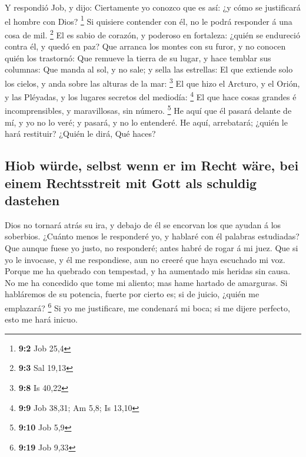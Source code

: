  Y respondió Job, y dijo:  Ciertamente yo
conozco que es así: ¿y cómo se justificará el hombre con Dios?
\footnote{\textbf{9:2} Job 25,4}  Si quisiere contender
con él, no le podrá responder á una cosa de mil. \footnote{\textbf{9:3}
  Sal 19,13}  El es sabio de corazón, y poderoso en
fortaleza: ¿quién se endureció contra él, y quedó en paz? 
Que arranca los montes con su furor, y no conocen quién los trastornó:
 Que remueve la tierra de su lugar, y hace temblar sus
columnas:  Que manda al sol, y no sale; y sella las
estrellas:  El que extiende solo los cielos, y anda sobre
las alturas de la mar: \footnote{\textbf{9:8} Is 40,22} 
El que hizo el Arcturo, y el Orión, y las Pléyadas, y los lugares
secretos del mediodía: \footnote{\textbf{9:9} Job 38,31; Am 5,8; Is
  13,10}  El que hace cosas grandes é incomprensibles, y
maravillosas, sin número. \footnote{\textbf{9:10} Job 5,9}
 He aquí que él pasará delante de mí, y yo no lo veré; y
pasará, y no lo entenderé.  He aquí, arrebatará; ¿quién
le hará restituir? ¿Quién le dirá, Qué haces?

\hypertarget{hiob-wuxfcrde-selbst-wenn-er-im-recht-wuxe4re-bei-einem-rechtsstreit-mit-gott-als-schuldig-dastehen}{%
\subsection{Hiob würde, selbst wenn er im Recht wäre, bei einem
Rechtsstreit mit Gott als schuldig
dastehen}\label{hiob-wuxfcrde-selbst-wenn-er-im-recht-wuxe4re-bei-einem-rechtsstreit-mit-gott-als-schuldig-dastehen}}

 Dios no tornará atrás su ira, y debajo de él se encorvan
los que ayudan á los soberbios.  ¿Cuánto menos le
responderé yo, y hablaré con él palabras estudiadas?  Que
aunque fuese yo justo, no responderé; antes habré de rogar á mi juez.
 Que si yo le invocase, y él me respondiese, aun no
creeré que haya escuchado mi voz.  Porque me ha quebrado
con tempestad, y ha aumentado mis heridas sin causa.  No
me ha concedido que tome mi aliento; mas hame hartado de amarguras.
 Si habláremos de su potencia, fuerte por cierto es; si
de juicio, ¿quién me emplazará? \footnote{\textbf{9:19} Job 9,33}
 Si yo me justificare, me condenará mi boca; si me dijere
perfecto, esto me hará inicuo.

